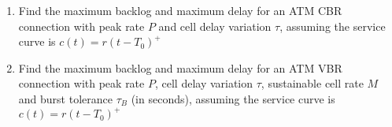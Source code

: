 \begin{problem}
        \begin{enumerate}
                        \item Find the maximum backlog and maximum delay for an ATM
                CBR connection with peak rate $P$ and cell delay variation
                $\tau$, assuming the service curve is $c(t) = r(t-T_{0})^{+}$

                \item Find the maximum backlog and maximum delay for an ATM
                VBR connection with peak rate $P$, cell delay variation
                $\tau$, sustainable cell rate $M$ and burst tolerance
$\tau_{B}$ (in
                seconds), assuming the service curve is $c(t) = r(t-T_{0})^{+}$
\sol{ }
\end{enumerate}

\end{problem}

